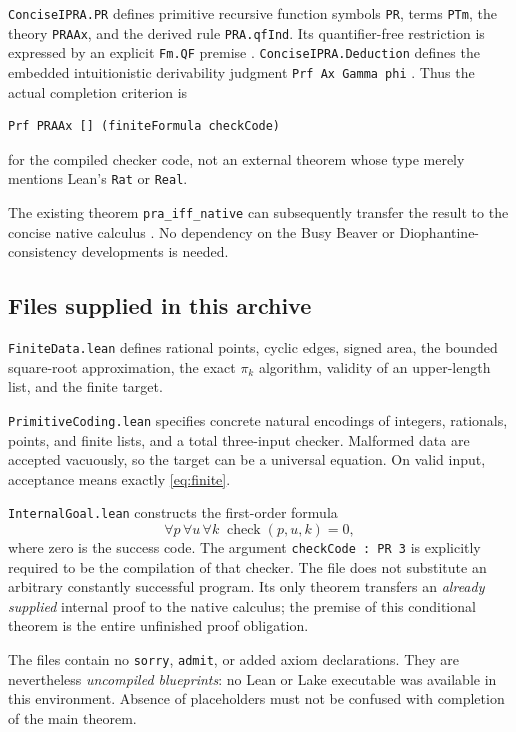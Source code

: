 \documentclass[11pt,a4paper]{article}
\theoremstyle{definition}
\begin{document}
\texttt{ConciseIPRA.PR} defines primitive recursive function symbols
\texttt{PR}, terms \texttt{PTm}, the theory \texttt{PRAAx}, and the
derived rule \texttt{PRA.qfInd}. Its quantifier-free restriction is
expressed by an explicit \texttt{Fm.QF} premise
\cite{proveit-pr}. \texttt{ConciseIPRA.Deduction} defines the embedded
intuitionistic derivability judgment \texttt{Prf Ax Gamma phi}
\cite{proveit-deduction}. Thus the actual completion criterion is
\begin{lstlisting}
Prf PRAAx [] (finiteFormula checkCode)
\end{lstlisting}
for the compiled checker code, not an external theorem whose type
merely mentions Lean's \texttt{Rat} or \texttt{Real}.

The existing theorem \texttt{pra\_iff\_native} can subsequently
transfer the result to the concise native calculus
\cite{proveit-native}. No dependency on the Busy Beaver or
Diophantine-consistency developments is needed.

\subsection{Files supplied in this archive}
\texttt{FiniteData.lean} defines rational points, cyclic edges, signed
area, the bounded square-root approximation, the exact \(\pi_k\)
algorithm, validity of an upper-length list, and the finite target.

\texttt{PrimitiveCoding.lean} specifies concrete natural encodings of
integers, rationals, points, and finite lists, and a total three-input
checker. Malformed data are accepted vacuously, so the target can be
a universal equation. On valid input, acceptance means exactly
\eqref{eq:finite}.

\texttt{InternalGoal.lean} constructs the first-order formula
\[
 \forall p\,\forall u\,\forall k\;
   \operatorname{check}(p,u,k)=0,
 \tag{12.1}\label{eq:internal}
\]
where zero is the success code. The argument
\texttt{checkCode : PR 3} is explicitly required to be the compilation
of that checker. The file does not substitute an arbitrary constantly
successful program. Its only theorem transfers an \emph{already
supplied} internal proof to the native calculus; the premise of this
conditional theorem is the entire unfinished proof obligation.

The files contain no \texttt{sorry}, \texttt{admit}, or added axiom
declarations. They are nevertheless \emph{uncompiled blueprints}:
no Lean or Lake executable was available in this environment.
Absence of placeholders must not be confused with completion of the
main theorem.
\end{document}

